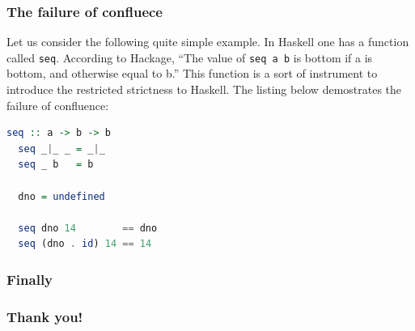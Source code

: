 \documentclass[10pt,pdf,utf8,russian,aspectratio=169]{beamer}
\begin{document}
\begin{frame}[fragile]
  \frametitle{The failure of confluece}

  Let us consider the following quite simple example. In Haskell one has a function called \verb"seq". According to Hackage, ``The value of \verb"seq a b" is bottom if a is bottom, and otherwise equal to b.'' This function is a sort of instrument to introduce the restricted strictness to Haskell. The listing below demostrates the failure of confluence:

  \begin{lstlisting}[language=Haskell]
  seq :: a -> b -> b
  seq _|_ _ = _|_
  seq _ b   = b

  dno = undefined

  seq dno 14        == dno
  seq (dno . id) 14 == 14
  \end{lstlisting}

\end{frame}

\begin{frame}
  \frametitle{Finally}


\end{frame}

\begin{frame}
  \frametitle{Thank you!}
\end{frame}
\end{document}
